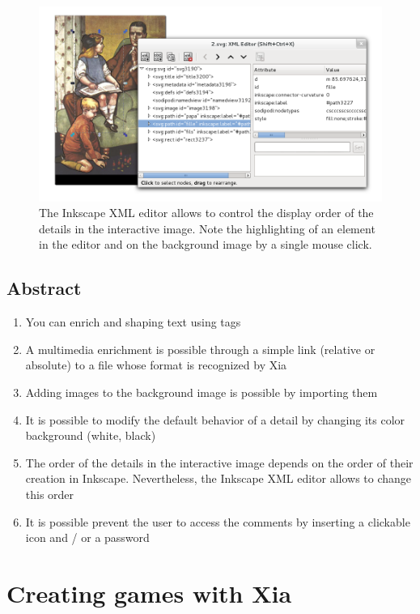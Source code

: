 \begin{figure}[htp]
 \centering
 \includegraphics[width=\textwidth]{images/ordre_couches}
 \caption[The Inkscape XML Editor and the display order of the details]{The Inkscape XML editor allows to control the display order of the details in the interactive image. Note the highlighting of an element  
in the editor and on the background image by a single mouse click.}
 \label{ordre_couches}
\end{figure}

\subsection{Abstract}

\begin{enumerate}
 \item You can enrich and shaping text using tags
 \item A multimedia enrichment is possible through a simple link (relative
or absolute) to a file whose format is recognized by Xia
 \item Adding images to the background image is possible by importing them
 \item It is possible to modify the default behavior of a detail by changing its color 
background (white, black)
 \item The order of the details in the interactive image depends on the order
of their creation in Inkscape. Nevertheless, the Inkscape XML editor allows to change this order
\item It is possible prevent the user to access the comments by inserting a clickable icon and / or a password
\end{enumerate}

\newpage

\section{Creating games with Xia}\label{games_IA}

